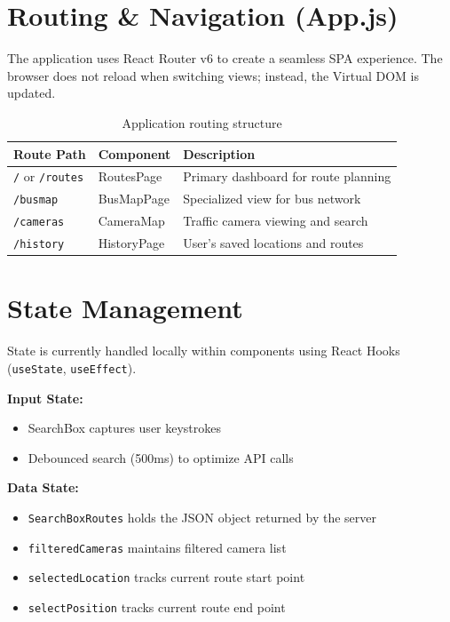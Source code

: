 \section{Routing \& Navigation (App.js)}

The application uses React Router v6 to create a seamless SPA experience. The browser does not reload when switching views; instead, the Virtual DOM is updated.

\begin{table}[htbp]
\centering
\begin{tabular}{|l|l|p{6cm}|}
\hline
\textbf{Route Path} & \textbf{Component} & \textbf{Description} \\
\hline
\texttt{/} or \texttt{/routes} & RoutesPage & Primary dashboard for route planning \\
\hline
\texttt{/busmap} & BusMapPage & Specialized view for bus network \\
\hline
\texttt{/cameras} & CameraMap & Traffic camera viewing and search \\
\hline
\texttt{/history} & HistoryPage & User's saved locations and routes \\
\hline
\end{tabular}
\caption{Application routing structure}
\label{tab:routes}
\end{table}

\section{State Management}

State is currently handled locally within components using React Hooks (\texttt{useState}, \texttt{useEffect}).

\textbf{Input State:}
\begin{itemize}
    \item SearchBox captures user keystrokes
    \item Debounced search (500ms) to optimize API calls
\end{itemize}

\textbf{Data State:}
\begin{itemize}
    \item \texttt{SearchBoxRoutes} holds the JSON object returned by the server
    \item \texttt{filteredCameras} maintains filtered camera list
    \item \texttt{selectedLocation} tracks current route start point
    \item \texttt{selectPosition} tracks current route end point
\end{itemize}

